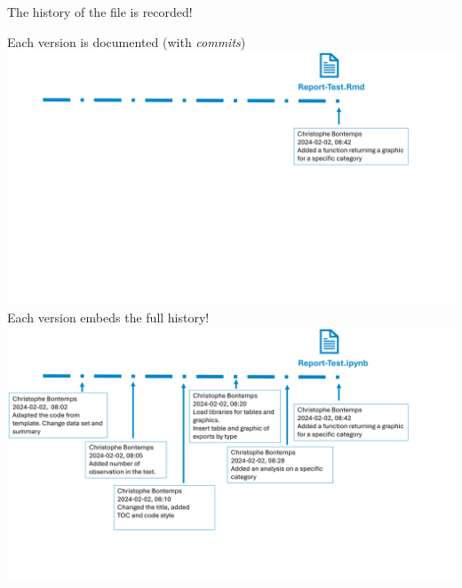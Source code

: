 \documentclass[xcolor=x11names,compress]{beamer}
\renewcommand{\(}{\begin{columns}}
\renewcommand{\)}{\end{columns}}
\newcommand{\<}[1]{\begin{column}{#1}}
\renewcommand{\>}{\end{column}}
\begin{document}
\begin{frame}{The history of the file is recorded!}
\begin{center}
\begin{itemize}
    {Each version is documented (with \emph{commits}) \\ }
    {\includegraphics[width = 1.0\textwidth]{FileLifeHistoryEnd.png} \\ }
    {Each version embeds the full history!  }
    {\includegraphics[width = 1.0\textwidth]{FileLifeHistoryFull.png} \\ }
\end{itemize}
\end{center}
\end{frame}
\end{document}

